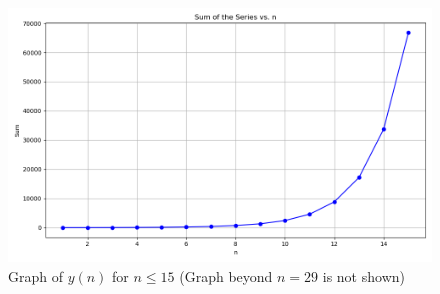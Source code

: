 \documentclass[a4,12pt,onecolumn]{IEEEtran}
\begin{document}
\begin{figure}[ht]
    \centering
    \includegraphics[width=\columnwidth]{figs/main.png}
    \caption{Graph of $y(n)$ for $n \leq 15$ (Graph beyond $n = 29$ is not shown)}
    \label{fig:example}
\end{figure}
\end{document}
